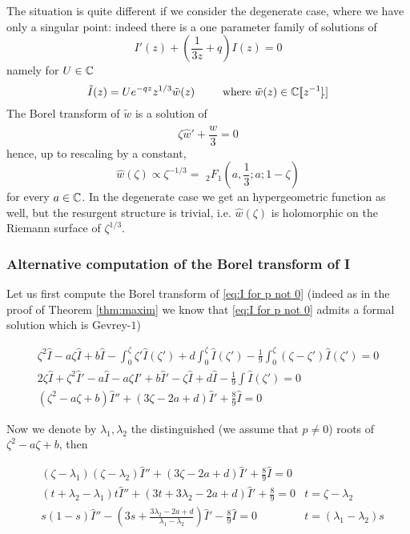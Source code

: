 \documentclass[11pt,a4paper,twoside,leqno,noamsfonts]{amsart}
\numberwithin{equation}{section}
\begin{document}
The situation is quite different if we consider the degenerate case, where we have only a singular point: indeed there is a one parameter family of solutions of 
\begin{equation}
I'(z)+\left(\frac{1}{3z}+q\right)I(z)=0
\end{equation}
namely for $U\in\mathbb C$
\begin{equation}
\tilde{I}(z)=Ue^{-qz}z^{1/3}\tilde{w}(z)\,\qquad \text{ where } \tilde{w}(z)\in\mathbb C[\![z^{-1}]\!.]
\end{equation} 
The Borel transform of $\tilde{w}$ is a solution of 
\begin{equation}
\zeta\hat{w}'+\frac{\hat{w}}{3}=0
\end{equation}
hence, up to rescaling by a constant, \[\hat{w}(\zeta)\propto \zeta^{-1/3}=\,\, {}_2F_1\left(a,\frac{1}{3};a;1-\zeta\right)\] for every $a\in \mathbb C$. In the degenerate case we get an hypergeometric function as well, but the resurgent structure is trivial, i.e. $\hat{w}(\zeta)$ is holomorphic on the Riemann surface of $\zeta^{1/3}$. 
 

\subsubsection{Alternative computation of the Borel transform of I}

Let us first compute the Borel transform of \eqref{eq:I for p not 0} (indeed as in the proof of Theorem \ref{thm:maxim} we know that \eqref{eq:I for p not 0} admits a formal solution which is Gevrey-$1$)

\begin{align*}
\zeta^2\hat{I}-a\zeta\hat{I}+b\hat{I}-\int_0^{\zeta}\zeta'\hat{I}(\zeta')+d\int_0^{\zeta}\hat{I}(\zeta')-\frac{1}{9}\int_0^{\zeta}(\zeta-\zeta')\hat{I}(\zeta')=0\\
2\zeta\hat{I}+\zeta^2\hat{I}'-a\hat{I}-a\zeta\hat{I}'+b\hat{I}'-\zeta\hat{I}+d\hat{I}-\frac{1}{9}\int\hat{I}(\zeta')=0\\
(\zeta^2-a\zeta+b)\hat{I}''+(3\zeta-2a+d)\hat{I}'+\frac{8}{9}\hat{I}=0
\end{align*}

Now we denote by $\lambda_1,\lambda_2$ the distinguished (we assume that $p\neq 0$) roots of $\zeta^2-a\zeta+b$, then 

\begin{align}
& (\zeta-\lambda_1)(\zeta-\lambda_2)\hat{I}''+(3\zeta-2a+d)\hat{I}'+\frac{8}{9}\hat{I}=0 & \\
&(t+\lambda_2-\lambda_1)t\hat{I}''+(3t+3\lambda_2-2a+d)\hat{I}'+\frac{8}{9}=0 & t=\zeta-\lambda_2 \\
& \label{eq:I hyper} s(1-s)\hat{I}''-\left(3s+\frac{3\lambda_2-2a+d}{\lambda_1-\lambda_2}\right)\hat{I}'-\frac{8}{9}\hat{I}=0 & t=(\lambda_1-\lambda_2)s
\end{align}
\end{document}
